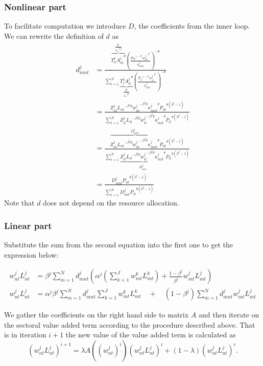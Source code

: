 \documentclass[11pt,oneside,a4paper]{article}
\begin{document}
\subsubsection{Nonlinear part}
To facilitate computation we introduce $D$, the coefficients from the inner loop.
We can rewrite the definition of $d$ as
\begin{align*}
  d_{mnt}^j &= \frac{\overbrace{T_n^j {A_{nt}^j}^{\theta}}^{\frac{Z_{nt}^j}{{L_{nt}}^{\beta^j\theta}}} \left(\frac{{P_{nt}}^{1 - \beta^j} {w_{nt}^j}^{\beta^j}}{\kappa_{mnt}^j}\right)^{-\theta}}{\sum_{i = 1}^N \underbrace{T_i^j {A_{it}^j}^{\theta}}_{\frac{Z_{it}^j}{{L_{it}}^{\beta^j\theta}}} \left(\frac{{P_{it}}^{1 - \beta^j} {w_{it}^j}^{\beta^j}}{\kappa_{mit}^j}\right)^{-\theta}}\\
%
  &= \frac{Z_{nt}^j {L_{nt}}^{- \beta^j\theta} {w_{nt}^j}^{-\beta^j\theta} {\kappa_{mnt}^j}^{\theta}{P_{nt}}^{\theta(\beta^j - 1)}}{\sum_{i = 1}^N Z_{it}^j {L_{it}}^{- \beta^j\theta} {w_{it}^j}^{-\beta^j\theta} {\kappa_{mit}^j}^{\theta}{P_{it}}^{\theta(\beta^j - 1)}}\\
%
  &= \frac{\overbrace{Z_{nt}^j {L_{nt}}^{- \beta^j\theta} {w_{nt}^j}^{-\beta^j\theta} {\kappa_{mnt}^j}^{\theta}}^{D_{mnt}^j}{P_{nt}}^{\theta(\beta^j - 1)}}{\sum_{i = 1}^N \underbrace{Z_{it}^j {L_{it}}^{- \beta^j\theta} {w_{it}^j}^{-\beta^j\theta} {\kappa_{mit}^j}^{\theta}}_{D_{mit}^j}{P_{it}}^{\theta(\beta^j - 1)}}\\
%
  &= \frac{D_{mnt}^j {P_{nt}}^{\theta(\beta^j - 1)}}{\sum_{i = 1}^N D_{mit}^j{P_{it}}^{\theta(\beta^j - 1)}}
\end{align*}
Note that $d$ does not depend on the resource allocation.

\subsubsection{Linear part}
Substitute the sum from the second equation into the first one to get the expression below:

\begin{align*}
w_{nt}^j L_{nt}^j &= \beta^j \sum_{m = 1}^N d_{mnt}^j \left( \alpha^j \left(\sum_{k = 1}^J w_{mt}^k L_{mt}^k\right) + \frac{1 - \beta^j}{\beta^j} w_{mt}^j L_{mt}^j\right)\\
%
w_{nt}^j L_{nt}^j &= \alpha^j \beta^j \sum_{m = 1}^N  d_{mnt}^j \sum_{k = 1}^J w_{mt}^k L_{mt}^k \quad + \quad (1 - \beta^j)\sum_{m = 1}^N d_{mnt}^j w_{mt}^j L_{mt}^j
\end{align*}

We gather the coefficients on the right hand side to matrix $A$ and then iterate on the sectoral value added term according to the procedure described above. That is in iteration $i + 1$ the new value of the value added term is calculated as
$$\left(w_{nt}^j L_{nt}^j\right)^{i + 1} = \lambda A\!\left(\left(w_{nt}^j\right)^i\right) \left(w_{nt}^j L_{nt}^j\right)^i + (1 - \lambda) \left(w_{nt}^j L_{nt}^j\right)^i.$$
\end{document}

